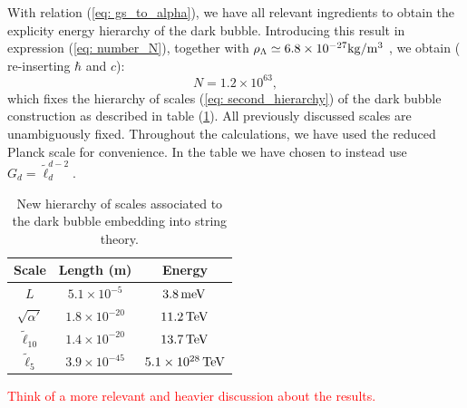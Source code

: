 With relation (\ref{eq: gs_to_alpha}), we have all relevant ingredients to obtain the explicity energy hierarchy of the dark bubble. Introducing this result in expression (\ref{eq: number_N}), together with $\rho_\Lambda \simeq 6.8 \times 10^{-27} {\rm kg/m^3}$ \cite{Aghanim:2020aa}, we obtain ( re-inserting $\hbar$ and $c$):
\begin{equation}
    N = 1.2 \times 10^{63},
\end{equation}
which fixes the hierarchy of scales (\ref{eq: second_hierarchy}) of the dark bubble construction as described in table (\ref{Table: 1}). All previously discussed scales are unambiguously fixed. Throughout the calculations, we have used the reduced Planck scale for convenience. In the table we have chosen to instead use $G_d=\tilde{\ell}_d^{d-2}$.
\begin{table}[h!]
	\centering
	\begin{tabular}{c|c|c}
	\textbf{Scale} & \textbf{Length (m)} & \textbf{Energy} \\
	\hline
    \hline
	$L$ &  $5.1 \times 10^{-5}$ &  $3.8 \, {\rm meV}$ \\
    $\sqrt{\alpha'}$ & $1.8 \times 10^{-20}$ & $11.2\, {\rm TeV}$  \\
    $\tilde{\ell}_{10}$ & $1.4 \times 10^{-20}$ &  $13.7 \, {\rm TeV}$ \\
    $\tilde{\ell}_{5}$ & $3.9 \times 10^{-45}$ & $5.1 \times 10^{28} \,{\rm TeV}$
	\end{tabular}
	\caption{New hierarchy of scales associated to the dark bubble embedding into string theory.}
	\label{Table: 1}
\end{table}

\textcolor{red}{Think of a more relevant and heavier discussion about the results.}






